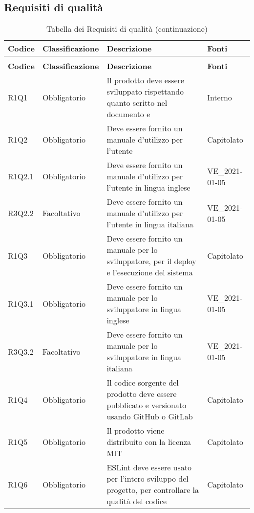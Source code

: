 \subsection{Requisiti di qualità}

{


\centering
\renewcommand{\arraystretch}{2}
\begin{longtable}{C{2.5cm} C{2.8cm} C{6.7cm} C{2.5cm}}
\caption{Tabella dei Requisiti di qualità}\\
\textbf{Codice} &
\textbf{Classificazione}&
\textbf{Descrizione}&
\textbf{Fonti}\\
\endfirsthead
{}
\caption*{Tabella dei Requisiti di qualità (continuazione)}\\
\textbf{Codice} &
\textbf{Classificazione}&
\textbf{Descrizione}&
\textbf{Fonti}\\
\endhead


R1Q1 & Obbligatorio & Il prodotto deve essere sviluppato rispettando quanto scritto nel documento  e  & Interno \\
R1Q2 & Obbligatorio & Deve essere fornito un manuale d'utilizzo per l'utente & Capitolato \\
R1Q2.1 & Obbligatorio & Deve essere fornito un manuale d'utilizzo per l'utente in lingua inglese & VE\_2021-01-05 \\
R3Q2.2 & Facoltativo & Deve essere fornito un manuale d'utilizzo per l'utente in lingua italiana & VE\_2021-01-05 \\
R1Q3 & Obbligatorio & Deve essere fornito un manuale per lo sviluppatore, per il deploy e l'esecuzione del sistema & Capitolato \\
R1Q3.1 & Obbligatorio & Deve essere fornito un manuale per lo sviluppatore in lingua inglese & VE\_2021-01-05 \\
R3Q3.2 & Facoltativo & Deve essere fornito un manuale per lo sviluppatore in lingua italiana & VE\_2021-01-05 \\
R1Q4 & Obbligatorio & Il codice sorgente del prodotto deve essere pubblicato e versionato usando GitHub o GitLab & Capitolato \\
R1Q5 & Obbligatorio & Il prodotto viene distribuito con la licenza MIT & Capitolato \\
R1Q6 & Obbligatorio & ESLint deve essere usato per l'intero sviluppo del progetto, per controllare la qualità del codice & Capitolato \\

\end{longtable}

}